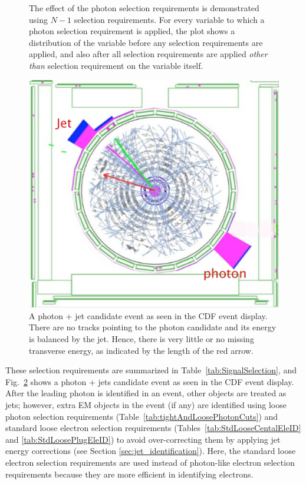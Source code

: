 \begin{figure}[p]
 \caption{The effect of the photon selection requirements is demonstrated using $N-1$ selection requirements. For every variable to which a photon selection requirement is applied, the plot shows a distribution of the variable before any selection requirements are applied, and also after all selection requirements are applied \textit{other than} selection requirement on the variable itself.}
\label{fig:PhotonNminusOneCuts_2}
\end{figure}

\begin{figure}[p]
 \centering
 \includegraphics[scale=0.65]{./p1j_cot_edited.pdf}
 \caption{A photon + jet candidate event as seen in the CDF event display. There are no tracks pointing to the photon candidate and its energy is balanced by the jet. Hence, there is very little or no missing transverse energy, as indicated by the length of the red arrow.}
 \label{fig:pj1_EvtDisplay}
\end{figure}

These selection requirements are summarized in Table~\ref{tab:SignalSelection}, and Fig.~\ref{fig:pj1_EvtDisplay} shows a photon + jets candidate event as seen in the CDF event display. After the leading photon is identified in an event, other objects are treated as jets; however, extra EM objects in the event (if any) are identified using loose photon selection requirements (Table~\ref{tab:tightAndLoosePhotonCuts}) and standard loose electron selection requirements (Tables~\ref{tab:StdLooseCentalEleID} and \ref{tab:StdLoosePlugEleID}) to avoid over-correcting them by applying jet energy corrections (see Section \ref{sec:jet_identification}). Here, the standard loose electron selection requirements are used instead of photon-like electron selection requirements because they are more efficient in identifying electrons.

